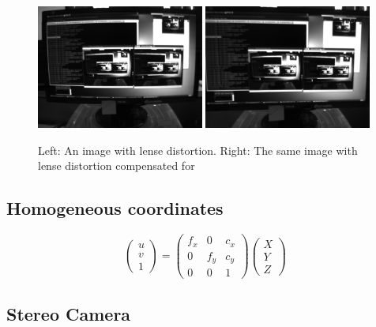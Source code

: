 \begin{figure}[h]
  \centering
    \includegraphics[width=0.49\textwidth]{chapters/images/distorted}
    \includegraphics[width=0.49\textwidth]{chapters/images/undistorted}
  \caption{Left: An image with lense distortion.  Right: The same image with lense distortion
compensated for}
\end{figure}

\subsection{Homogeneous coordinates}


\begin{equation}
 \begin{pmatrix}
  u \\
  v \\
  1 
 \end{pmatrix} =
 \begin{pmatrix}
  f_x & 0 & c_x \\
  0 & f_y & c_y \\
  0 & 0   & 1 
 \end{pmatrix}
 \begin{pmatrix}
  X \\ Y \\ Z
 \end{pmatrix}
\end{equation}


\subsection{Stereo Camera}

